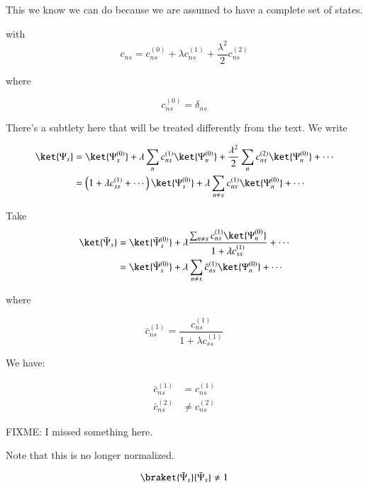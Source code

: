 This we know we can do because we are assumed to have a complete set of states.

with
\begin{equation}\label{eqn:qmTwoL3:490}
c_{ns} = c_{ns}^{(0)}  + \lambda c_{ns}^{(1)} + \frac{\lambda^2}{2} c_{ns}^{(2)}
\end{equation}

where

\begin{equation}\label{eqn:qmTwoL3:510}
c_{ns}^{(0)} = \delta_{ns}
\end{equation}

There's a subtlety here that will be treated differently from the text.  We write

\begin{align*}
\ket{\Psi_s}
&=
\ket{\Psi_s^{(0)}}
+ 
\lambda 
\sum_n
c_{ns}^{(1)} 
\ket{\Psi_n^{(0)}}
+ 
\frac{\lambda^2}{2} 
\sum_n
c_{ns}^{(2)}
\ket{\Psi_n^{(0)}}
+ \cdots \\
&=
\left(
1 + \lambda c_{ss}^{(1)} + \cdots
\right)
\ket{\Psi_s^{(0)}}
+ \lambda 
\sum_{n \ne s} c_{ns}^{(1)} 
\ket{\Psi_n^{(0)}}
+ \cdots
\end{align*}

Take
\begin{align*}
\ket{\bar{\Psi}_s}
&=
\ket{\bar{\Psi}_s^{(0)}}
+ 
\lambda
\frac{
\sum_{n \ne s} c_{ns}^{(1)} 
\ket{\Psi_n^{(0)}}
}
{
1 + \lambda c_{ss}^{(1)}
} 
+ \cdots
\\
&=
\ket{\bar{\Psi}_s^{(0)}}
+ 
\lambda
\sum_{n \ne s} \bar{c}_{ns}^{(1)} 
\ket{\Psi_n^{(0)}} + \cdots
\end{align*}

where 

\begin{equation}\label{eqn:qmTwoL3:n}
\bar{c}_{ns}^{(1)}  =
\frac{c_{ns}^{(1)} }
{
1 + \lambda c_{ss}^{(1)}
} 
\end{equation}

We have: 

\begin{align*}
\bar{c}_{ns}^{(1)} &= c_{ns}^{(1)} \\
\bar{c}_{ns}^{(2)} &\ne c_{ns}^{(2)} 
\end{align*}

FIXME: I missed something here.

Note that this is no longer normalized.

\begin{equation}\label{eqn:qmTwoL3:530}
\braket{\bar{\Psi}_s}{\bar{\Psi}_s} \ne 1
\end{equation}

\EndArticle
